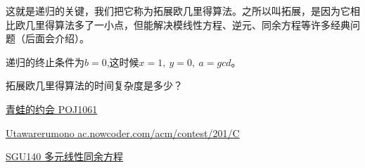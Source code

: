 这就是递归的关键，我们把它称为{\heiti 拓展欧几里得算法}。之所以叫拓展，是因为它相比欧几里得算法多了一小点，但能解决模线性方程、逆元、同余方程等许多经典问题（后面会介绍）。

递归的终止条件为$b=0$,这时候$x=1,\ y=0,\ a = gcd$。



\vbox{}

\vbox{}

\begin{problemset}
	\item 拓展欧几里得算法的时间复杂度是多少？
	\item \href{http://poj.org/problem?id=1061}{青蛙的约会 \quad POJ1061} 
	\item \href{https://ac.nowcoder.com/acm/contest/201/C}{Utawarerumono \quad ac.nowcoder.com/acm/contest/201/C}
	\item \href{https://codeforces.com/problemsets/acmsguru/problem/99999/140}{SGU140 \quad 多元线性同余方程} 
\end{problemset}










